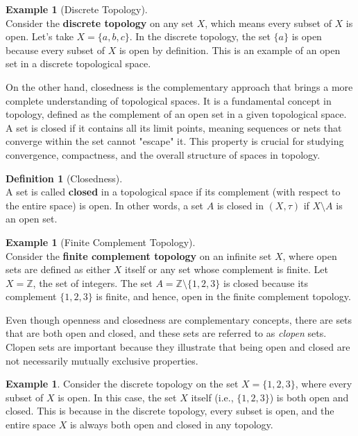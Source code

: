 \documentclass[12pt, reqno]{amsart}
\theoremstyle{definition}
\newtheorem{definition}[theorem]{Definition}
\newtheorem{example}[theorem]{Example}
\numberwithin{equation}{section}
\begin{document}
\begin{example}[Discrete Topology] \hfill\\
Consider the \textbf{discrete topology} on any set $X$, which means every subset of $X$ is open. Let's take $X = \{a, b, c\}$. In the discrete topology, the set $\{a\}$ is open because every subset of $X$ is open by definition. This is an example of an open set in a discrete topological space.
\end{example}

On the other hand, closedness is the complementary approach that brings a more complete understanding of topological spaces. It is a fundamental concept in topology, defined as the complement of an open set in a given topological space. A set is closed if it contains all its limit points, meaning sequences or nets that converge within the set cannot "escape" it. This property is crucial for studying convergence, compactness, and the overall structure of spaces in topology.

\begin{definition}[Closedness]  \hfill\\
A set is called \textbf{closed} in a topological space if its complement (with respect to the entire space) is open. In other words, a set $A$ is closed in $(X, \tau)$ if $X \setminus A$ is an open set.
\end{definition}

\begin{example}[Finite Complement Topology]  \hfill\\
Consider the \textbf{finite complement topology} on an infinite set $X$, where open sets are defined as either $X$ itself or any set whose complement is finite. Let $X = \mathbb{Z}$, the set of integers. The set $A = \mathbb{Z} \setminus \{1, 2, 3\}$ is closed because its complement $\{1, 2, 3\}$ is finite, and hence, open in the finite complement topology.
\end{example}

Even though openness and closedness are complementary concepts, there are sets that are both open and closed, and these sets are referred to as \textit{clopen} sets. Clopen sets are important because they illustrate that being open and closed are not necessarily mutually exclusive properties.
\begin{example} 
Consider the discrete topology on the set $X = \{1, 2, 3\}$, where every subset of $X$ is open. In this case, the set $X$ itself (i.e., $\{1, 2, 3\}$) is both open and closed. This is because in the discrete topology, every subset is open, and the entire space $X$ is always both open and closed in any topology.
\end{example}
\end{document}
